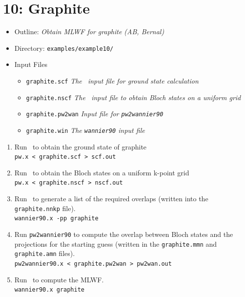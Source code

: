 \documentclass[a4paper,11pt,twoside]{article}
\begin{document}
\cleardoublepage

\section*{10: Graphite}
\begin{itemize}
\item{Outline: \it{Obtain MLWF for graphite (AB, Bernal)}}
\item{Directory: {\tt examples/example10/}}
\item{Input Files}
\begin{itemize}
\item{ {\tt graphite.scf}  {\it The \pwscf\ input file for ground
    state calculation}} 
\item{ {\tt graphite.nscf}  {\it The \pwscf\ input file to obtain Bloch
    states on a uniform grid}} 
\item{ {\tt graphite.pw2wan}  {\it Input file for {\tt pw2wannier90}}}
\item{ {\tt graphite.win}  {\it The {\tt wannier90} input file}}
\end{itemize}
\end{itemize}

\begin{enumerate}
\item Run \pwscf\ to obtain the ground state of graphite\\
{\tt pw.x < graphite.scf > scf.out}

\item Run \pwscf\ to obtain the Bloch states on a uniform k-point grid\\
{\tt pw.x < graphite.nscf > nscf.out}

\item Run \wannier\ to generate a list of the required overlaps (written
  into the {\tt graphite.nnkp} file).\\ 
{\tt wannier90.x -pp graphite}

\item Run {\tt pw2wannier90} to compute the overlap between Bloch
  states and the projections for the starting guess (written in the
  {\tt graphite.mmn} and {\tt graphite.amn} files).\\  
{\tt pw2wannier90.x < graphite.pw2wan > pw2wan.out}

\item Run \wannier\ to compute the MLWF.\\
{\tt wannier90.x graphite}
\end{enumerate}
\end{document}
